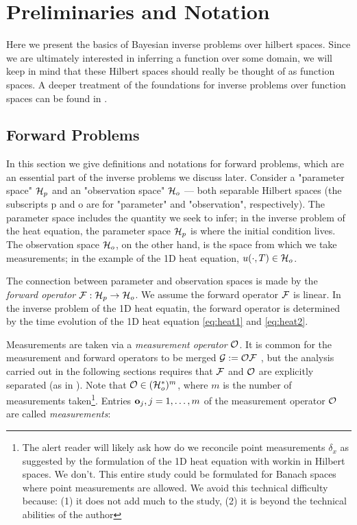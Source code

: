 \section{Preliminaries and Notation}\label{section:prelim}
Here we present the basics of Bayesian inverse problems over hilbert
spaces. Since we are ultimately interested in inferring a function
over some domain, we will keep in mind that these Hilbert spaces
should really be thought of as function spaces. A deeper treatment of
the foundations for inverse problems over function spaces can be found
in \cite{Stuart10}.


\subsection{Forward Problems}\label{subsec:abstract_OED}
In this section we give definitions and notations for forward problems,
which are an essential part of the inverse problems we discuss
later. Consider a "parameter space" \(\mathcal{H}_p\) and an "observation
space" \(\mathcal{H}_o\) --- both separable Hilbert spaces (the subscripts p
and o are for "parameter" and "observation", respectively). The
parameter space includes the quantity we seek to infer; in the inverse
problem of the heat equation, the parameter space $\mathcal{H}_p$ is where the
initial condition lives. The observation space $\mathcal{H}_o$, on the other
hand, is the space from which we take measurements; in the example of
the 1D heat equation, $u(\cdot, T) \in \mathcal{H}_o$.

The connection between parameter and observation spaces is made by the
\emph{forward operator} \(\mathcal{F}: \mathcal{H}_p \to \mathcal{H}_o\). We assume the
forward operator \(\mathcal{F}\) is linear. In the inverse problem of the 1D
heat equatin, the forward operator is determined by the time evolution
of the 1D heat equation \eqref{eq:heat1} and \eqref{eq:heat2}.

Measurements are taken via a \emph{measurement operator} \(\mathcal{O}\). It
is common for the measurement and forward operators to be merged
\(\mathcal{G} := \mathcal{O} \mathcal{F}\) \cite{AlexanderianGloorGhattas14}, but the
analysis carried out in the following sections requires that \(\mathcal{F}\)
and \(\mathcal{O}\) are explicitly separated (as in
\cite{attia2022stochastic, cvetkovic2023choosing}). Note that \(\mathcal{O}
\in ( \mathcal{H}_o^* )^m\), where \(m\) is the number of measurements
taken\footnote{The alert reader will likely ask how do we reconcile
point measurements $\delta_x$ as suggested by the formulation of the
1D heat equation with workin in Hilbert spaces. We don't. This entire
study could be formulated for Banach spaces where point measurements
are allowed. We avoid this technical difficulty because: (1) it does
not add much to the study, (2) it is beyond the technical abilities of
the author}. Entries \(\mathbf{o}_j, j=1,\dots,m\) of the measurement
operator \(\mathcal{O}\) are called \emph{measurements}:

